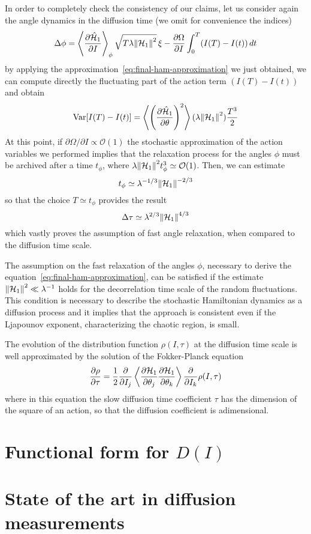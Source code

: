 In order to completely check the consistency of our claims, let us consider again the angle dynamics in the diffusion time (we omit for convenience the indices)
\begin{equation}
	\Delta \phi = \left\langle\pdv{\hat{\mathcal{H}}_1}{I}\right\rangle_{\phi}\sqrt{T\lambda\norm{\mathcal{H}_1}^2}\,\xi -\pdv{\Omega}{I}\int_0^T(I(T)-I(t))\,dt
\end{equation}
by applying the approximation~\eqref{eq:final-ham-approximation} we just obtained, we can compute directly the fluctuating part of the action term \((I(T)-I(t))\) and obtain
\begin{equation}
	\operatorname{Var}[I(T)-I(t)]=\left\langle\left(\pdv{\hat{\mathcal{H}}_1}{\theta}\right)^2\right\rangle(\lambda\norm{\mathcal{H}_1}^2)\frac{T^3}{2}
\end{equation}
At this point, if \(\partial\Omega/\partial I\propto \mathcal{O}(1)\) the stochastic approximation of the action variables we performed implies that the relaxation process for the angles \(\phi\) must be archived after a time \(t_\phi\), where \(\lambda\norm{\mathcal{H}_1}^2 t_\phi^3 \simeq \mathcal{O}(1)\). Then, we can estimate
\begin{equation}
	t_\phi \simeq \lambda^{-1/3}\norm{\mathcal{H}_1}^{-2/3}
\end{equation}
so that the choice \(T\simeq t_\phi\) provides the result
\begin{equation}
	\Delta \tau \simeq \lambda^{2/3}\norm{\mathcal{H}_1}^{4/3}
\end{equation}
which vastly proves the assumption of fast angle relaxation, when compared to the diffusion time scale.

The assumption on the fast relaxation of the angles \(\phi\), necessary to derive the equation~\eqref{eq:final-ham-approximation}, can be satisfied if the estimate \(\norm{\mathcal{H}_1}^2 \ll \lambda^{-1}\) holds for the decorrelation time scale of the random fluctuations. This condition is necessary to describe the stochastic Hamiltonian dynamics as a diffusion process and it implies that the approach is consistent even if the Ljapounov exponent, characterizing the chaotic region, is small.

The evolution of the distribution function \(\rho(I,\tau)\) at the diffusion time scale is well approximated by the solution of the Fokker-Planck equation
\begin{equation}
	\pdv{\rho}{\tau}=\frac{1}{2}\pdv{}{I_j}\left\langle\pdv{\mathcal{H}_1}{\theta_j}\pdv{\mathcal{H}_1}{\theta_k}\right\rangle\pdv{}{I_k}\rho(I,\tau)
\end{equation}
where in this equation the slow diffusion time coefficient \(\tau\) has the dimension of the square of an action, so that the diffusion coefficient is adimensional.


\section{Functional form for $D(I)$}


\section{State of the art in diffusion measurements}